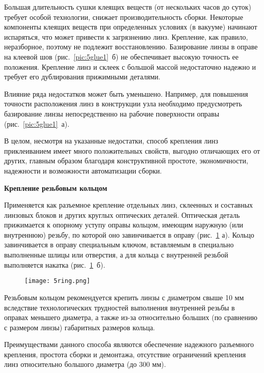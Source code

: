 Большая длительность сушки клеящих веществ (от нескольких часов до суток) требует особой технологии, снижает производительность сборки. Некоторые компоненты клеящих веществ при определенных условиях (в вакууме) начинают испаряться, что может привести к загрязнению линз. Крепление, как правило, неразборное, поэтому не подлежит восстановлению. Базирование линзы в оправе на клеевой шов (рис.~\ref{pic:5glue1}~б) не обеспечивает высокую точность ее положения. Крепление линз и склеек с большой массой недостаточно надежно и требует его дублирования прижимными деталями.

Влияние ряда недостатков может быть уменьшено. Например, для повышения точности расположения линз в конструкции узла необходимо предусмотреть базирование линзы непосредственно на рабочие поверхности оправы (рис.~\ref{pic:5glue1}~а). 

В целом, несмотря на указанные недостатки, способ крепления линз приклеиванием имеет много положительных свойств, выгодно отличающих его от других, главным образом благодаря конструктивной простоте, экономичности, надежности и возможности автоматизации сборки.

\begin{flushleft}
	\textbf{Крепление резьбовым кольцом}
\end{flushleft}

Применяется как разъемное крепление отдельных линз, склеенных и составных линзовых блоков и других круглых оптических деталей. Оптическая деталь прижимается к опорному уступу оправы кольцом, имеющим наружную (или внутреннюю) резьбу, по которой оно завинчивается в оправу (рис.~\ref{pic:5ring} а). Кольцо завинчивается в оправу специальным ключом, вставляемым в специально выполненные шлицы или отверстия, а для кольца с внутренней резьбой выполняется накатка (рис.~\ref{pic:5ring}~б).

\begin{figure}[h!]
	\texttt{[image: 5ring.png]}
	\label{pic:5ring}
\end{figure}

Резьбовым кольцом рекомендуется крепить линзы с диаметром свыше 10 мм вследствие технологических трудностей выполнения внутренней резьбы в оправах меньшего диаметра, а также из-за относительно больших (по сравнению с размером линзы) габаритных размеров кольца.

Преимуществами данного способа являются обеспечение надежного разъемного крепления, простота сборки и демонтажа, отсутствие ограничений крепления линз относительно большого диаметра (до 300 мм). 

